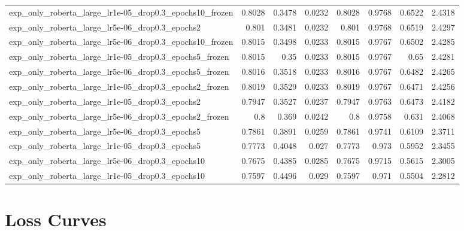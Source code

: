 \documentclass[a4paper,oneside,bibliography=totoc]{scrbook}
\begin{document}
\begin{landscape}
\begin{center}
\begin{longtable}{p{4cm} *{7}{r}}
exp\_only\_roberta\_large\_lr1e-05\_drop0.3\_epochs10\_frozen & 0.8028 & 0.3478 & 0.0232 & 0.8028 & 0.9768 & 0.6522 & 2.4318 \\ 
        exp\_only\_roberta\_large\_lr5e-06\_drop0.3\_epochs2 & 0.801 & 0.3481 & 0.0232 & 0.801 & 0.9768 & 0.6519 & 2.4297 \\ 
        exp\_only\_roberta\_large\_lr5e-06\_drop0.3\_epochs10\_frozen & 0.8015 & 0.3498 & 0.0233 & 0.8015 & 0.9767 & 0.6502 & 2.4285 \\ 
        exp\_only\_roberta\_large\_lr1e-05\_drop0.3\_epochs5\_frozen & 0.8015 & 0.35 & 0.0233 & 0.8015 & 0.9767 & 0.65 & 2.4281 \\ 
        exp\_only\_roberta\_large\_lr5e-06\_drop0.3\_epochs5\_frozen & 0.8016 & 0.3518 & 0.0233 & 0.8016 & 0.9767 & 0.6482 & 2.4265 \\ 
        exp\_only\_roberta\_large\_lr1e-05\_drop0.3\_epochs2\_frozen & 0.8019 & 0.3529 & 0.0233 & 0.8019 & 0.9767 & 0.6471 & 2.4256 \\ 
        exp\_only\_roberta\_large\_lr1e-05\_drop0.3\_epochs2 & 0.7947 & 0.3527 & 0.0237 & 0.7947 & 0.9763 & 0.6473 & 2.4182 \\ 
        exp\_only\_roberta\_large\_lr5e-06\_drop0.3\_epochs2\_frozen & 0.8 & 0.369 & 0.0242 & 0.8 & 0.9758 & 0.631 & 2.4068 \\ 
        exp\_only\_roberta\_large\_lr5e-06\_drop0.3\_epochs5 & 0.7861 & 0.3891 & 0.0259 & 0.7861 & 0.9741 & 0.6109 & 2.3711 \\ 
        exp\_only\_roberta\_large\_lr1e-05\_drop0.3\_epochs5 & 0.7773 & 0.4048 & 0.027 & 0.7773 & 0.973 & 0.5952 & 2.3455 \\ 
        exp\_only\_roberta\_large\_lr5e-06\_drop0.3\_epochs10 & 0.7675 & 0.4385 & 0.0285 & 0.7675 & 0.9715 & 0.5615 & 2.3005 \\ 
        exp\_only\_roberta\_large\_lr1e-05\_drop0.3\_epochs10 & 0.7597 & 0.4496 & 0.029 & 0.7597 & 0.971 & 0.5504 & 2.2812 \\ 
\end{longtable}
\end{center}
\end{landscape}

\chapter{Loss Curves}
\label{app:losses}
\end{document}
